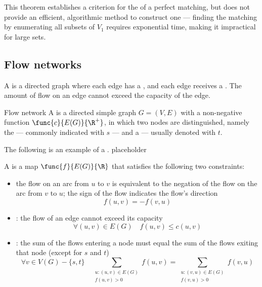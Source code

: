 \documentclass[a4paper, 12pt]{report}
\begin{document}
    This theorem establishes a criterion for the  of a perfect matching, but does not provide an efficient, algorithmic method to construct one --- finding the matching by enumerating all subsets of $V_1$ requires exponential time, making it impractical for large sets.

    \subsection{Flow networks}

    A  is a directed graph where each edge has a , and each edge receives a . The amount of flow on an edge cannot exceed the capacity of the edge.

    \begin{frameddefn}{Flow network}
        A  is a directed simple graph $G = (V, E)$ with a non-negative  function $\func{c}{E(G)}{\R^+}$, in which two nodes are distinguished, namely the  --- commonly indicated with $s$ --- and a  --- usually denoted with $t$.
    \end{frameddefn}

    \begin{example}
        The following is an example of a . placeholder 
    \end{example}

    A  is a map $\func{f}{E(G)}{\R}$ that satisfies the following two constraints:

    \begin{itemize}
        \item {} the flow on an arc from $u$ to $v$ is equivalent to the negation of the flow on the arc from $v$ to $u$; the sign of the flow indicates the flow's direction $$f(u,v) = -f(v, u)$$
        \item {}: the flow of an edge cannot exceed its capacity $$\forall (u, v) \in E(G) \quad f(u, v) \le c(u, v)$$
        \item {}: the sum of the flows entering a node must equal the sum of the flows exiting that node (except for $s$ and $t$) $$\forall v \in V(G) - \{s, t\} \quad \sum_{\substack{u:(u, v) \in E(G) \\f(u, v) >0}}{f(u, v)} = \sum_{\substack{u:(v, u)\in E(G) \\ f(v, u) >0}}{f(v, u)}$$
    \end{itemize}
\end{document}
